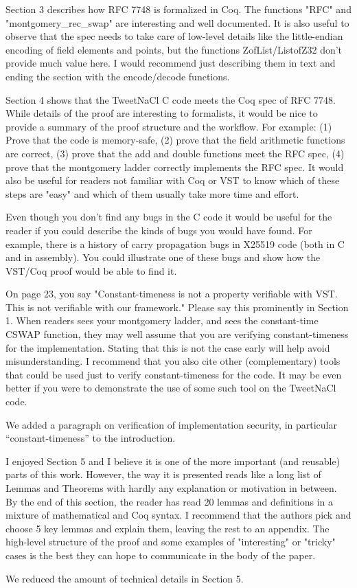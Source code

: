 Section 3 describes how RFC 7748 is formalized in Coq. The functions "RFC" and "montgomery\_rec\_swap" are interesting and well documented. It is also useful to observe that the spec needs to take care of low-level details like the little-endian encoding of field elements and points, but the functions ZofList/ListofZ32 don't provide much value here. I would recommend just describing them in text and ending the section with the encode/decode functions.

Section 4 shows that the TweetNaCl C code meets the Coq spec of RFC 7748. While details of the proof are interesting to formalists, it would be nice to provide a summary of the proof structure and the workflow. For example: (1) Prove that the code is memory-safe, (2) prove that the field arithmetic functions are correct, (3) prove that the add and double functions meet the RFC spec, (4) prove that the montgomery ladder correctly implements the RFC spec. It would also be useful for readers not familiar with Coq or VST to know which of these steps are "easy" and which of them usually take more time and effort.

Even though you don't find any bugs in the C code it would be useful for the reader if you could describe the kinds of bugs you would have found. For example, there is a history of carry propagation bugs in X25519 code (both in C and in assembly). You could illustrate one of these bugs and show how the VST/Coq proof would be able to find it.

On page 23, you say "Constant-timeness is not a property verifiable with VST. This is not verifiable with our framework." Please say this prominently in Section 1. When readers sees your montgomery ladder, and sees the constant-time CSWAP function, they may well assume that you are verifying constant-timeness for the implementation. Stating that this is not the case early will help avoid misunderstanding. I recommend that you also cite other (complementary) tools that could be used just to verify constant-timeness for the code. It may be even better if you were to demonstrate the use of some such tool on the TweetNaCl code.
\begin{answer}
  We added a paragraph on verification of implementation security, in particular ``constant-timeness'' to the introduction.
\end{answer}

I enjoyed Section 5 and I believe it is one of the more important (and reusable) parts of this work. However, the way it is presented reads like a long list of Lemmas and Theorems with hardly any explanation or motivation in between. By the end of this section, the reader has read 20 lemmas and definitions in a mixture of mathematical and Coq syntax. I recommend that the authors pick and choose 5 key lemmas and explain them, leaving the rest to an appendix. The high-level structure of the proof and some examples of "interesting" or "tricky" cases is the best they can hope to communicate in the body of the paper.
\begin{answer}
  We reduced the amount of technical details in Section 5.
\end{answer}


